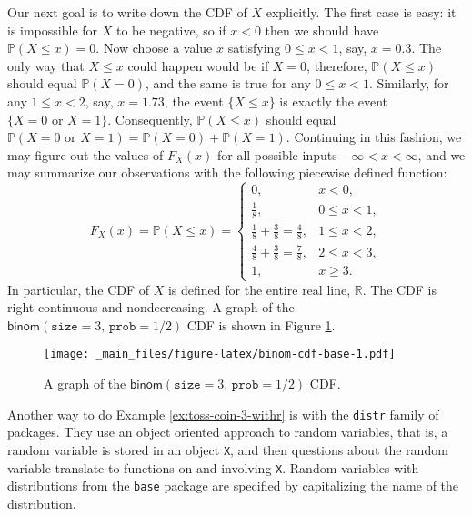 \documentclass[]{book}
\numberwithin{equation}{chapter}
\numberwithin{figure}{chapter}
\theoremstyle{plain}
\theoremstyle{definition}
\theoremstyle{remark}
\theoremstyle{definition}
\theoremstyle{definition}
\theoremstyle{remark}
\let\BeginKnitrBlock\begin \let\EndKnitrBlock\end
\begin{document}
Our next goal is to write down the CDF of \(X\) explicitly. The first
case is easy: it is impossible for \(X\) to be negative, so if \(x<0\)
then we should have \(\mathbb{P}(X\leq x)=0\). Now choose a value \(x\)
satisfying \(0\leq x<1\), say, \(x=0.3\). The only way that \(X\leq x\)
could happen would be if \(X=0\), therefore, \(\mathbb{P}(X\leq x)\)
should equal \(\mathbb{P}(X=0)\), and the same is true for any
\(0\leq x<1\). Similarly, for any \(1\leq x<2\), say, \(x=1.73\), the
event \(\{ X\leq x \}\) is exactly the event
\(\{ X=0\mbox{ or }X=1 \}\). Consequently, \(\mathbb{P}(X\leq x)\)
should equal
\(\mathbb{P}(X=0\mbox{ or }X=1)=\mathbb{P}(X=0)+\mathbb{P}(X=1)\).
Continuing in this fashion, we may figure out the values of \(F_{X}(x)\)
for all possible inputs \(-\infty<x<\infty\), and we may summarize our
observations with the following piecewise defined function:
\[ F_{X}(x)=\mathbb{P}(X\leq x) = \begin{cases} 0, & x < 0,\\ \frac{1}{8}, & 0\leq x < 1,\\ \frac{1}{8} + \frac{3}{8} = \frac{4}{8}, & 1\leq x < 2,\\ \frac{4}{8} + \frac{3}{8} = \frac{7}{8}, & 2\leq x < 3,\\ 1, & x \geq 3. \end{cases} \]
In particular, the CDF of \(X\) is defined for the entire real line,
\(\mathbb{R}\). The CDF is right continuous and nondecreasing. A graph
of the \(\mathsf{binom}(\mathtt{size}=3,\,\mathtt{prob}=1/2)\) CDF is
shown in Figure \ref{fig:binom-cdf-base}.

\begin{figure}[htbp]
\centering
\texttt{[image: \_main\_files/figure-latex/binom-cdf-base-1.pdf]}
\caption{\label{fig:binom-cdf-base}\small A graph of the
\(\mathsf{binom}(\mathtt{size}=3,\,\mathtt{prob}=1/2)\) CDF.}
\end{figure}




\bigskip

\BeginKnitrBlock{example}
\protect\hypertarget{ex:unnamed-chunk-209}{}{\label{ex:unnamed-chunk-209}}Another
way to do Example \ref{ex:toss-coin-3-withr} is with the \texttt{distr}
family of packages. They use an object oriented approach to random
variables, that is, a random variable is stored in an object \texttt{X},
and then questions about the random variable translate to functions on
and involving \texttt{X}. Random variables with distributions from the
\texttt{base} package are specified by capitalizing the name of the
distribution.
\EndKnitrBlock{example}
\end{document}
